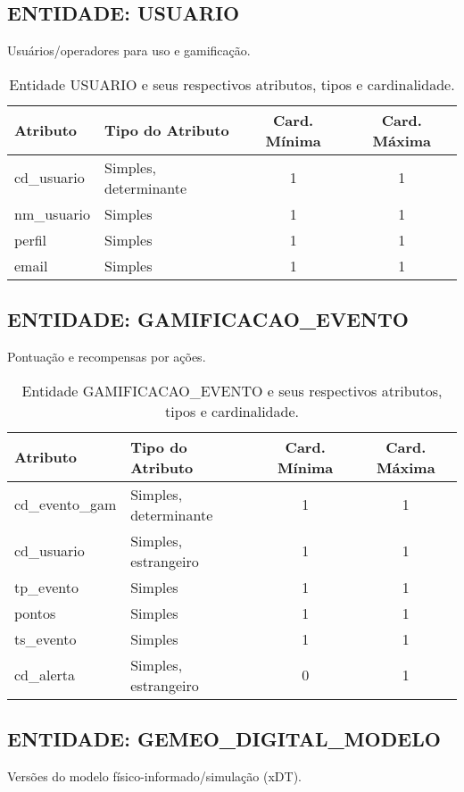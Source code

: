 \documentclass[10pt,a4paper]{article}
\begin{document}
\subsection*{ENTIDADE: USUARIO}
Usuários/operadores para uso e gamificação.

\begin{table}[h!]
\centering
\begin{tabular}{| l | l | c | c |}
\hline
\rowcolor{red}\color{white}\textbf{Atributo} & \color{white}\textbf{Tipo do Atributo} & \color{white}\textbf{Card. Mínima} & \color{white}\textbf{Card. Máxima} \\
\hline
cd\_usuario & Simples, determinante & 1 & 1 \\
nm\_usuario & Simples & 1 & 1 \\
perfil & Simples & 1 & 1 \\
email & Simples & 1 & 1 \\
\hline
\end{tabular}
\caption{Entidade USUARIO e seus respectivos atributos, tipos e cardinalidade.}
\label{tab:usuario}
\end{table}

\subsection*{ENTIDADE: GAMIFICACAO\_EVENTO}
Pontuação e recompensas por ações.

\begin{table}[h!]
\centering
\begin{tabular}{| l | l | c | c |}
\hline
\rowcolor{red}\color{white}\textbf{Atributo} & \color{white}\textbf{Tipo do Atributo} & \color{white}\textbf{Card. Mínima} & \color{white}\textbf{Card. Máxima} \\
\hline
cd\_evento\_gam & Simples, determinante & 1 & 1 \\
cd\_usuario & Simples, estrangeiro & 1 & 1 \\
tp\_evento & Simples & 1 & 1 \\
pontos & Simples & 1 & 1 \\
ts\_evento & Simples & 1 & 1 \\
cd\_alerta & Simples, estrangeiro & 0 & 1 \\
\hline
\end{tabular}
\caption{Entidade GAMIFICACAO\_EVENTO e seus respectivos atributos, tipos e cardinalidade.}
\label{tab:gamificacao_evento}
\end{table}

\subsection*{ENTIDADE: GEMEO\_DIGITAL\_MODELO}
Versões do modelo físico-informado/simulação (xDT).
\end{document}
